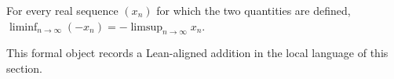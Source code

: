 \begin{remark*}
For every real sequence $(x_n)$ for which the two quantities are defined, $\liminf_{n\to\infty}(-x_n)=-\limsup_{n\to\infty}x_n$.
\end{remark*}

\begin{remark*}[Interpretation]
This formal object records a Lean-aligned addition in the local language of this section.
\end{remark*}

\begin{dependencies}
\NoLocalDependencies
\end{dependencies}
